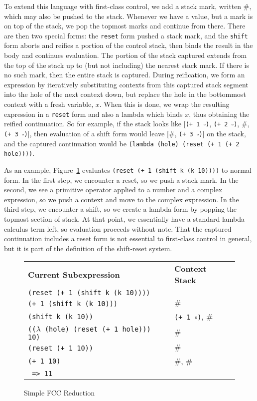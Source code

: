 \documentclass[11pt]{article}
\begin{document}
To extend this language with first-class control, we add a stack mark, written $\#$, which may also be pushed to the stack.
Whenever we have a value, but a mark is on top of the stack, we pop the topmost marks and continue from there.
There are then two special forms:
the \texttt{reset} form pushed a stack mark, and the \texttt{shift} form aborts and reifies a portion of the control stack, then binds the result in the body and continues evaluation.
The portion of the stack captured extends from the top of the stack up to (but not including) the nearest stack mark.
If there is no such mark, then the entire stack is captured.
During reification, we form an expression by iteratively substituting contexts from this captured stack segment into the hole of the next context down, but replace the hole in the bottommost context with a fresh variable, $x$.
When this is done, we wrap the resulting expression in a \texttt{reset} form and also a lambda which binds $x$, thus obtaining the reified continuation.
So for example, if the stack looks like [\texttt{(+ 1 $\square$)}, \texttt{(+ 2 $\square$)}, $\#$, \texttt{(+ 3 $\square$)}], then evaluation of a shift form would leave [$\#$, \texttt{(+ 3 $\square$)}] on the stack, and the captured continuation would be \texttt{(lambda (hole) (reset (+ 1 (+ 2 hole))))}.

As an example, Figure~\ref{fig:simple-fcc-reduction} evaluates \texttt{(reset (+ 1 (shift k (k 10))))} to normal form.
In the first step, we encounter a reset, so we push a stack mark.
In the second, we see a primitive operator applied to a number and a complex expression, so we push a context and move to the complex expression.
In the third step, we encounter a shift, so we create a lambda form by popping the topmost section of stack.
At that point, we essentially have a standard lambda calculus term left, so evaluation proceeds without note.
That the captured continuation includes a reset form is not essential to first-class control in general, but it is part of the definition of the shift-reset system.

\begin{figure}
\caption{Simple FCC Reduction}
\label{fig:simple-fcc-reduction}
\begin{tabular}{ll}
\textbf{Current Subexpression} & \textbf{Context Stack} \\
\texttt{(reset (+ 1 (shift k (k 10))))} & \\
\texttt{(+ 1 (shift k (k 10)))} & $\#$ \\
\texttt{(shift k (k 10))} & \texttt{(+ 1 $\square$)}, $\#$ \\
\texttt{(($\lambda$ (hole) (reset (+ 1 hole))) 10)} & $\#$ \\
\texttt{(reset (+ 1 10))} & $\#$ \\
\texttt{(+ 1 10)} & $\#$, $\#$ \\
\texttt{ => 11} \\
\end{tabular}
\end{figure}
\end{document}
